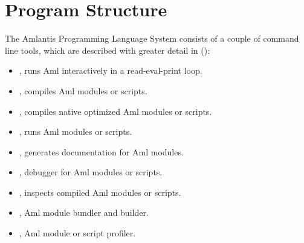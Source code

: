 
\chapter{Program Structure}
\label{sec:program-structure}

The Amlantis Programming Language System consists of a couple of command line tools, which are described with greater detail in (): 
\begin{itemize}
  \item {}, runs Aml interactively in a read-eval-print loop.
  \item {}, compiles Aml modules or scripts.
  \item {}, compiles native optimized Aml modules or scripts.
  \item {}, runs Aml modules or scripts.
  \item {}, generates documentation for Aml modules. 
  \item {}, debugger for Aml modules or scripts. 
  \item {}, inspects compiled Aml modules or scripts.
  \item {}, Aml module bundler and builder.
  \item {}, Aml module or script profiler.
\end{itemize}

